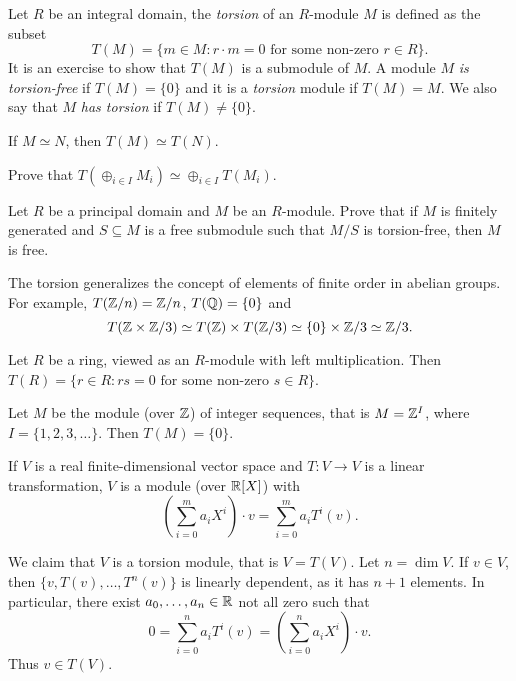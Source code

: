 Let $R$ be an integral domain, the \emph{torsion} of an $R$-module $M$ 
is defined as the subset 
\[
T(M)=\{m\in M:r\cdot m=0\text{ for some non-zero $r\in R$}\}.
\]
It is an exercise to show that $T(M)$ is a submodule of $M$. 
A module $M$ 
\emph{is torsion-free} if $T(M)=\{0\}$ and it is 
a \emph{torsion} module if $T(M)=M$.  We also say that $M$ \emph{has torsion}
if $T(M)\ne\{0\}$. 

\begin{exercise}
If $M\simeq N$, then $T(M)\simeq T(N)$.
\end{exercise}

\begin{exercise}
Prove that $T(\oplus_{i\in I}M_i)\simeq \oplus_{i\in I}T(M_i)$.
\end{exercise}

\begin{exercise}
\label{xca:free}
    Let $R$ be a principal domain and $M$ be an $R$-module. Prove that
    if $M$ is finitely generated and $S\subseteq M$ is a free submodule such that
    $M/S$ is torsion-free, then $M$ is free.
\end{exercise}

The torsion generalizes the concept of elements of finite order in abelian groups. For example, 
 $T(\mathbb{Z}/n)=\mathbb{Z}/n$, $T(\mathbb{Q})=\{0\}$ and
 \[
 T(\mathbb{Z}\times\mathbb{Z}/3)\simeq T(\mathbb{Z})\times T(\mathbb{Z}/3)\simeq \{0\}\times\mathbb{Z}/3\simeq\mathbb{Z}/3.
 \]

\begin{example}
    Let $R$ be a ring, viewed as an $R$-module with left multiplication. 
    Then $T(R)=\{r\in R:rs=0\text{ for some non-zero $s\in R$}\}$.
\end{example}

\begin{example}
    Let $M$ be the module (over $\mathbb{Z}$) of
    integer sequences, that is $M=\mathbb{Z}^I$, where 
    $I=\{1,2,3,\dots\}$. Then $T(M)=\{0\}$. 
\end{example}

\begin{example}
If $V$ is a real finite-dimensional vector space and $T\colon V\to V$ 
is a linear transformation, $V$ is a module (over $\mathbb{R}[X]$) 
with 
\[
\left(\sum_{i=0}^m a_iX^i\right)\cdot v=\sum_{i=0}^m a_iT^i(v).
\]

We claim that 
$V$ is a torsion module, that is $V=T(V)$. Let $n=\dim V$. If $v\in V$, 
then $\{v,T(v),\dots,T^n(v)\}$ is linearly dependent, as it has 
$n+1$ elements. In particular, there exist $a_0,\dots,a_n\in\mathbb{R}$ not all zero such that
\[
0=\sum_{i=0}^n a_iT^i(v)=\left(\sum_{i=0}^n a_iX^i\right)\cdot v.
\]
Thus $v\in T(V)$. 
\end{example}

